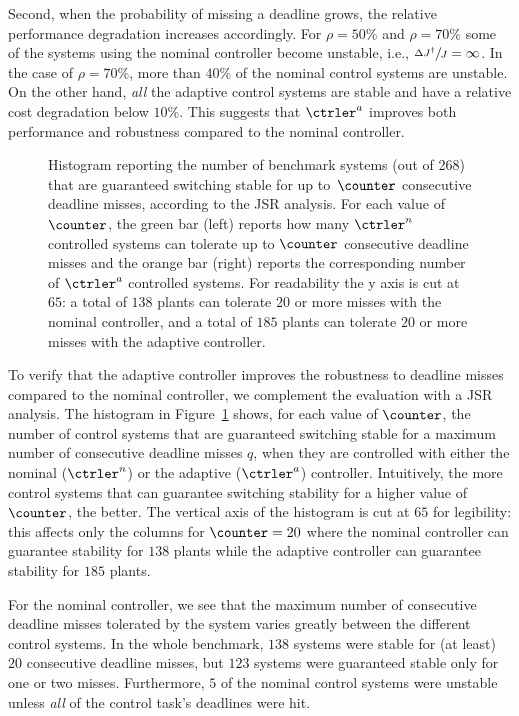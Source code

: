 Second, when the probability of missing a deadline grows, the relative performance degradation increases accordingly.
For $\rho=50\%$ and $\rho=70\%$ some of the systems using the nominal controller become unstable, i.e., $\sfrac{\Delta J^\dagger}{J} = \infty$.
In the case of $\rho=70\%$, more than $40\%$ of the nominal control systems are unstable.
On the other hand, \emph{all} the adaptive control systems are stable and have a relative cost degradation below $10\%$.
This suggests that $\ctrler^a$ improves both performance and robustness compared to the nominal controller.

\begin{figure}
    \centering
    
    \caption{Histogram reporting the number of benchmark systems (out of 268) that are guaranteed switching stable for up to~$\counter$ consecutive deadline misses, according to the JSR analysis.
    For each value of $\counter$, the green bar (left) reports how many $\ctrler^{n}$ controlled systems can tolerate up to $\counter$ consecutive deadline misses and the orange bar (right) reports the corresponding number of $\ctrler^{a}$ controlled systems.
    For readability the y axis is cut at $65$: a total of $138$ plants can tolerate $20$ or more misses with the nominal controller, and a total of $185$ plants can tolerate $20$ or more misses with the adaptive controller.}
    \label{fig:jsr-histogram}
\end{figure}

To verify that the adaptive controller improves the robustness to deadline misses compared to the nominal controller, we complement the evaluation with a JSR analysis.
The histogram in Figure~\ref{fig:jsr-histogram} shows, for each value of $\counter$, the number of control systems that are guaranteed switching stable for a maximum number of consecutive deadline misses $q$, when they are controlled with either the nominal ($\ctrler^n$) or the adaptive ($\ctrler^a$) controller.
Intuitively, the more control systems that can guarantee switching stability for a higher value of $\counter$, the better.
The vertical axis of the histogram is cut at $65$ for legibility: this affects only the columns for $\counter=20$ where the nominal controller can guarantee stability for $138$ plants while the adaptive controller can guarantee stability for $185$ plants.

For the nominal controller, we see that the maximum number of consecutive deadline misses tolerated by the system varies greatly between the different control systems.
In the whole benchmark, $138$ systems were stable for (at least) $20$ consecutive deadline misses, but $123$ systems were guaranteed stable only for one or two misses.
Furthermore, $5$ of the nominal control systems were unstable unless \emph{all} of the control task's deadlines were hit.

